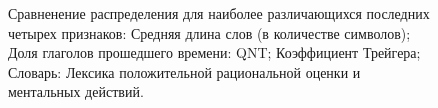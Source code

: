\documentclass[12pt]{article}
\begin{document}
\begin{figure}[ht!]  
\vspace{-4ex} \centering {}  
\hspace{2ex}
\vspace{2ex} \centering {}  
\hspace{2ex}
\caption{Сравненение распределения для наиболее различающихся последних четырех признаков:  Средняя длина слов (в количестве символов);  Доля глаголов прошедшего времени: QNT;  Коэффициент Трейгера;  Словарь: Лексика положительной рациональной оценки и ментальных действий.}  \label{hist3}
\end{figure}
\end{document}
